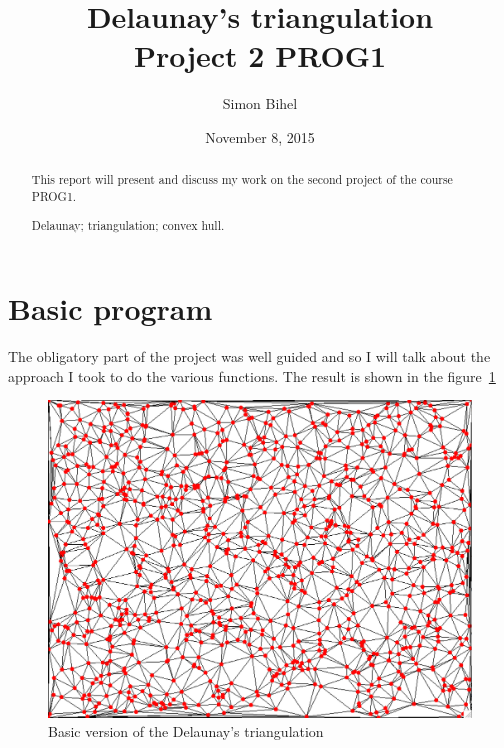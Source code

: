\documentclass[a4paper,11pt]{article}%
\newenvironment{keywords}%
{\description\item[Keyword.]}%
{\enddescription}
\begin{document}
\title{Delaunay's triangulation \\ Project 2 PROG1}

\author{Simon Bihel}

\date{November 8, 2015}

\maketitle

\begin{abstract}
	This report will present and discuss my work on the second project of the course PROG1.
\begin{keywords}
	Delaunay; triangulation; convex hull.
\end{keywords}
\end{abstract}


\section{Basic program}

The obligatory part of the project was well guided and so I will talk about the approach I took to do the various functions. The result is shown in the figure~\ref{fig:basic} 

\begin{figure}[H]
	\begin{center}
		\includegraphics[scale=0.3]{basic.png}
	\end{center}
	\caption{Basic version of the Delaunay's triangulation}
	\label{fig:basic}
\end{figure}
\end{document}
